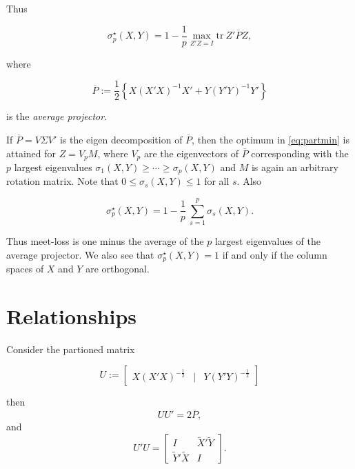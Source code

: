 \documentclass[
  12pt,
]{article}
\newenvironment{Shaded}{\begin{snugshade}}{\end{snugshade}}
\newcommand{\FunctionTok}[1]{\textcolor[rgb]{0.00,0.00,0.00}{#1}}
\newcommand{\NormalTok}[1]{#1}
\newcommand{\OtherTok}[1]{\textcolor[rgb]{0.56,0.35,0.01}{#1}}
\newcommand{\SpecialCharTok}[1]{\textcolor[rgb]{0.00,0.00,0.00}{#1}}
\begin{document}
Thus

\begin{equation}
\sigma_p^\star(X,Y)=1-\frac{1}{p}\max_{Z'Z=I}\text{tr}\ Z'\overline{P}Z,
\label{eq:partmin}
\end{equation}

where

\begin{equation}
\overline{P}:=\frac12\left\{X(X'X)^{-1}X'+Y(Y'Y)^{-1}Y'\right\}
\label{eq:avproj}
\end{equation}

is the \emph{average projector}.

If \(\overline{P}=V\Sigma V'\) is the eigen decomposition of \(\overline{P}\), then the optimum in \eqref{eq:partmin}
is attained for \(Z=V_pM\), where \(V_p\) are the eigenvectors of \(\overline{P}\) corresponding with the \(p\) largest eigenvalues \(\sigma_1(X,Y)\geq\cdots\geq\sigma_p(X,Y)\) and \(M\) is again an arbitrary
rotation matrix. Note that \(0\leq\sigma_s(X,Y)\leq 1\) for all \(s\). Also

\begin{equation}
\sigma_p^\star(X,Y)=1-\frac{1}{p}\  \sum_{s=1}^p\sigma_s(X,Y).
\label{eq:fullmin}
\end{equation}

Thus meet-loss is one minus the average of the \(p\) largest eigenvalues of
the average projector. We also see that \(\sigma_p^\star(X,Y)=1\) if and only
if the column spaces of \(X\) and \(Y\) are orthogonal.

\hypertarget{relationships}{%
\section{Relationships}\label{relationships}}

Consider the partioned matrix

\begin{equation}
U:=\begin{bmatrix}
X(X'X)^{-\frac12}&\mid&Y(Y'Y)^{-\frac12}
\end{bmatrix}
\label{eq:partmatrix}
\end{equation}

then
\[
UU'=2\overline{P},
\]
and
\[
U'U=\begin{bmatrix}I&\tilde X'\tilde Y\\
\tilde Y'\tilde X& I
\end{bmatrix}.
\]

\begin{Shaded}
\end{Shaded}
\end{document}
